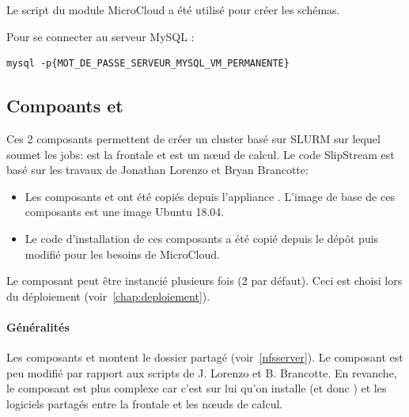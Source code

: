 Le script  du module MicroCloud a été utilisé pour créer les schémas.

Pour se connecter au serveur MySQL :
\begin{lstlisting}[style=bash]
mysql -p{MOT_DE_PASSE_SERVEUR_MYSQL_VM_PERMANENTE}
\end{lstlisting}

\subsection{Compoants  et } \label{master&slave}


Ces 2 composants permettent de créer un cluster basé sur SLURM sur lequel  soumet les jobs:
 est la frontale et  est un nœud de calcul.
Le code SlipStream est basé sur les travaux de Jonathan Lorenzo et Bryan Brancotte:
\begin{itemize}
    \item Les composants  et  ont été copiés depuis
    l'appliance \href{https://nuv.la/module/ifb/devzone/jlorenzo/cluster/Slurm_Cluster_ubuntu18}{}.
          L'image de base de ces composants est une image Ubuntu 18.04.
    \item Le code d'installation de ces composants a été copié depuis le dépôt 
          puis modifié pour les besoins de MicroCloud.
\end{itemize}
Le composant  peut être instancié plusieurs fois (2 par défaut).
Ceci est choisi lors du déploiement (voir~\autoref{chap:deploiement}).

\paragraph*{Généralités}

Les composants  et  montent le dossier partagé  (voir~\autoref{nfsserver}).
Le composant  est peu modifié par rapport aux scripts de J. Lorenzo et B. Brancotte.
En revanche, le composant  est plus complexe car
c'est sur lui qu'on installe  (et donc )
et les logiciels partagés entre la frontale et les nœuds de calcul.


